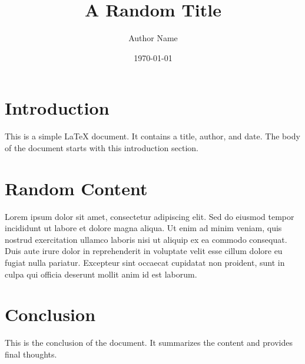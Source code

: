 \documentclass{article}
\title{A Random Title}
\author{Author Name}
\date{\today}
\begin{document}
\maketitle

\section{Introduction}
This is a simple LaTeX document. It contains a title, author, and date. The body of the document starts with this introduction section.

\section{Random Content}
Lorem ipsum dolor sit amet, consectetur adipiscing elit. Sed do eiusmod tempor incididunt ut labore et dolore magna aliqua. Ut enim ad minim veniam, quis nostrud exercitation ullamco laboris nisi ut aliquip ex ea commodo consequat. Duis aute irure dolor in reprehenderit in voluptate velit esse cillum dolore eu fugiat nulla pariatur. Excepteur sint occaecat cupidatat non proident, sunt in culpa qui officia deserunt mollit anim id est laborum.

\section{Conclusion}
This is the conclusion of the document. It summarizes the content and provides final thoughts.
\end{document}

